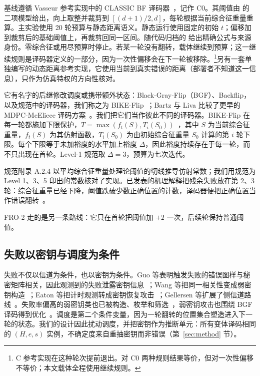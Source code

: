 \documentclass[UTF8,a4paper,10pt,twocolumn]{ctexart}
\begin{document}
基线遵循 Vasseur 参考实现中的 CLASSIC BF 译码器~\cite{vasseur2021thesis}，记作 C0。其阈值由  的二项模型给出，向上取整并裁剪到 $[(d+1)/2,d]$，每轮根据当前综合征重量重算。主实验使用 20 轮预算与静态距离语义。静态运行使用固定的初始 $t$；偏移加到裁剪后的基础阈值上，再裁剪回同一区间。随代码归档的  给出精确公式与来源身份。零综合征或用尽预算时停止。若某一轮没有翻转，载体继续到预算；这一继续规则是译码器定义的一部分，因为一次性偏移会在下一轮被移除。\footnote{C 参考实现在这种轮次提前退出。对 C0 两种规则结果等价，但对一次性偏移不等价；本文载体全程使用继续规则。}另有一套单独编写的动态距离参考实现，它使用当前到真实错误的距离（部署者不知道这一信息），只作为仿真特权的方向性核对。

它有名字的后继修改调度或携带额外状态：Black-Gray-Flip（BGF）、Backflip，以及规范中的译码器，我们称之为 BIKE-Flip~\cite{drucker2020shades,vasseur2021thesis,bike2024spec}；Bartz 与 Liva 比较了更早的 MDPC-McEliece 译码方案~\cite{bartz2019decoding}。我们把它们当作彼此不同的译码器。BIKE-Flip 在每一轮都施加下限保护，$T=\max(f_t(S),T_i(S_0))$~\cite{bike2024spec}，其中 $S$ 为当前综合征重量，$f_t(S)$ 为其仿射函数，$T_i(S_0)$ 为由初始综合征重量 $S_0$ 计算的第 $i$ 轮下限。每个下限等于未加裕度的水平加上裕度 $\Delta$，因此裕度持续存在于每一轮，而不只出现在首轮。Level-1 规范取 $\Delta=3$，预算为七次迭代。

规范附录 A.2.4 以平均综合征重量处理论阈值的切线推导仿射常数；我们用规范为 Level 1、3、5 印出的常数核对了实现。已发表的机理解释把残余失败放在第 2、3 轮：综合征重量已经下降，阈值跌破少数正确位置的计数，译码器便把正确位置当作错误翻转~\cite{sendrier2024seminar,wang2023weak}。

FRO-2 走的是另一条路线：它只在首轮把阈值加 $+2$ 一次，后续轮保持普通阈值。

\subsection{失败以密钥与调度为条件}

失败不仅以信道为条件，也以密钥为条件。Guo 等表明触发失败的错误图样与秘密矩阵相关，因此观测到的失败泄露密钥信息~\cite{guo2016key}；Wang 等把同一相关性变成弱密钥构造~\cite{wang2023weak}；Eaton 等把计时观测转成密钥恢复攻击~\cite{eaton2018timing}；Gellersen 等扩展了侧信道路线~\cite{gellersen2025}。失败率偏高的弱密钥类也已被构造、枚举和筛选~\cite{vasseur2021thesis,nosouhi2023weakkey,matthews2025combinatorial}，弱密钥攻击也围绕 BGF 译码得到优化~\cite{liu2025bgf}。调度是第二个条件变量，因为一轮翻转的位置集合塑造进入下一轮的状态。我们的设计因此扰动调度，并把密钥作为推断单元：所有变体译码相同的 $(H,e,s)$ 实例，不确定度来自重抽密钥而非错误（第~\ref{sec:method} 节）。
\end{document}
